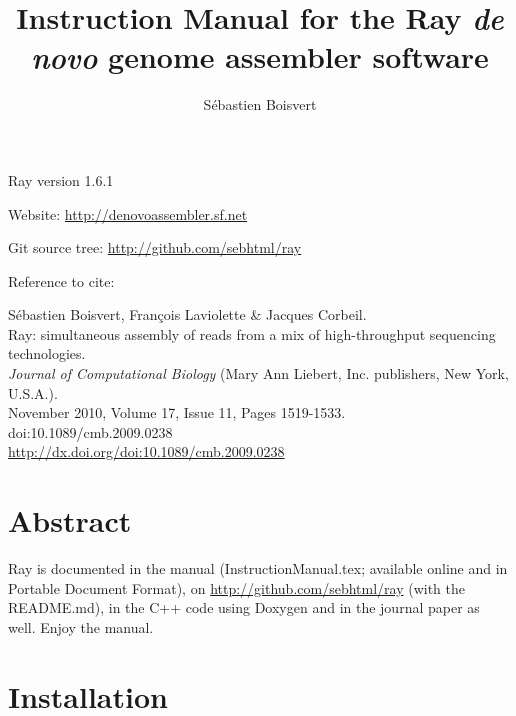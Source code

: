 \documentclass{article}
\begin{document}
\author{Sébastien Boisvert}
\title{Instruction Manual for the Ray \emph{de novo} genome assembler software}
\maketitle


\vspace{2cm}
Ray version 1.6.1

\vspace{2cm}

Website: \href{http://denovoassembler.sf.net}{http://denovoassembler.sf.net}

\vspace{0.4cm}

Git source tree: \href{http://github.com/sebhtml/ray}{http://github.com/sebhtml/ray}

\vspace{2cm}

Reference to cite: 
\vspace{2cm}

\noindent
Sébastien Boisvert, François Laviolette \& Jacques Corbeil.\\
Ray: simultaneous assembly of reads from a mix of high-throughput sequencing technologies.\\
\emph{Journal of Computational Biology} (Mary Ann Liebert, Inc. publishers, New York, U.S.A.).\\
November 2010, Volume 17, Issue 11, Pages 1519-1533.\\
doi:10.1089/cmb.2009.0238\\
\href{http://dx.doi.org/doi:10.1089/cmb.2009.0238}{http://dx.doi.org/doi:10.1089/cmb.2009.0238}


\newpage
\tableofcontents
\newpage

\section{Abstract}

Ray is documented in the manual (InstructionManual.tex; available
online and in Portable Document Format), 
on
\href{http://github.com/sebhtml/ray}{http://github.com/sebhtml/ray}
 (with the README.md), in the 
C++ code using Doxygen and in the journal paper as well.
Enjoy the manual.

\section{Installation}
\end{document}

